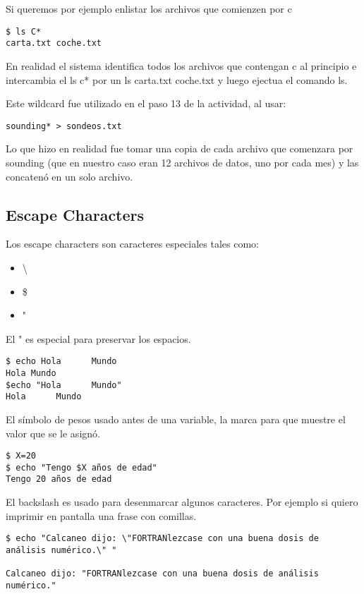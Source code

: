 \documentclass[a4paper]{article}
\begin{document}
Si queremos por ejemplo enlistar los archivos que comienzen por c
 
\begin{verbatim}
$ ls C*
carta.txt coche.txt
\end{verbatim}

En realidad el sistema identifica todos los archivos que contengan c al principio e intercambia el ls c* por un ls carta.txt coche.txt y luego ejectua el comando ls. 

Este wildcard fue utilizado en el paso 13 de la actividad, al usar:

\begin{verbatim}
sounding* > sondeos.txt
\end{verbatim}

Lo que hizo en realidad fue tomar una copia de cada archivo que comenzara por sounding (que en nuestro caso eran 12 archivos de datos, uno por cada mes) y las concatenó en un solo archivo.

\subsection{Escape Characters}
Los escape characters son caracteres especiales tales como:

\begin{itemize}
\item  \textbackslash
\item  \$
\item  "
\end{itemize}

El " es especial para preservar los espacios. 

\begin{verbatim} 
$ echo Hola      Mundo
Hola Mundo
$echo "Hola      Mundo"
Hola      Mundo
\end{verbatim}

El símbolo de pesos usado antes de una variable, la marca para que muestre el valor que se le asignó.

\begin{verbatim}
$ X=20
$ echo "Tengo $X años de edad"
Tengo 20 años de edad
\end{verbatim}


El backslash es usado para desenmarcar algunos caracteres. Por ejemplo si quiero imprimir en pantalla  una frase con comillas.

\begin{verbatim}
$ echo "Calcaneo dijo: \"FORTRANlezcase con una buena dosis de análisis numérico.\" "

Calcaneo dijo: "FORTRANlezcase con una buena dosis de análisis numérico."
\end{verbatim}
\end{document}
